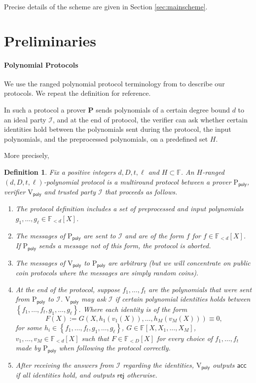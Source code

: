 \documentclass[11pt]{article} %
\newcommand{\F}{\ensuremath{\mathbb F}\xspace}
\newcommand{\rej}{\ensuremath{\mathsf{rej}}\xspace}
\newcommand{\acc}{\ensuremath{\mathsf{acc}}\xspace}
\newcommand{\defeq}{:=}
\newcommand{\prv}{\ensuremath{\mathsf{\mathbf{P}}}\xspace}
\newcommand{\prvpoly}{\ensuremath{\mathrm{P_{\mathsf{poly}}}}\xspace}
\newcommand{\verpoly}{\ensuremath{\mathrm{V_{\mathsf{poly}}}}\xspace}
\newcommand{\ideal}{\ensuremath{\mathcal{I}}\xspace}
\newcommand{\set}[1]{\ensuremath{\left\{#1\right\}}\xspace}
\newcommand{\polysofdeg}[1]{\ensuremath{\F_{< #1}[X]}\xspace}
\newtheorem{dfn}[lemma]{Definition}
\begin{document}
Precise details of the scheme are given in Section \ref{sec:mainscheme}.

\section{Preliminaries}
\paragraph{Polynomial Protocols}
We use the ranged polynomial protocol terminology from \cite{plonk} to describe our protocols. We repeat the definition for reference.

In such a protocol a prover \prv sends polynomials of a certain degree bound $d$ to an ideal party \ideal, and at the end of protocol, the verifier can ask whether certain identities hold between the polynomials sent during the protocol, the input polynomials, and the preprocessed polynomials, on a predefined set $H$.

More precisely,
\begin{dfn}\label{dfn:polyprotocol}
Fix a positive integers $d,D,t,\ell$ and $H\subset \F$.
An $H$-ranged \emph{$(d,D,t,\ell)$-polynomial protocol} is a multiround protocol between a prover \prvpoly, verifier 
\verpoly and trusted party \ideal that proceeds as follows.

\begin{enumerate}
\item The protocol definition includes a set of \emph{preprocessed and input polynomials} $g_1,\ldots,g_\ell \in \polysofdeg{d}$.

\item The messages of \prvpoly are sent to \ideal and are of the form $f$ for $f\in \polysofdeg{d}$. If \prvpoly sends a message not of this form, the protocol is aborted.
 
 
\item The messages of  \verpoly to \prvpoly are arbitrary (but we will concentrate on public coin protocols where the messages are simply random coins).


 \item At the end of the protocol, suppose $f_1,\ldots,f_t$ are the polynomials that were sent from \prvpoly to \ideal. \verpoly may ask \ideal if certain polynomial identities holds between \set{f_1,\ldots,f_t,g_1,\ldots,g_\ell}.
 Where each identity is of the form
 \[F(X)\defeq G(X, h_1(v_1(X)),\ldots,h_M(v_M(X)))\equiv 0,\]
 for some $h_i\in  \set{f_1,\ldots,f_t,g_1,\ldots,g_\ell}$, $G\in \F[X,X_1,\ldots,X_{M}]$, $v_1,\ldots,v_{M} \in \polysofdeg{d}$
 such that $F\in \polysofdeg{D}$ for every choice of $f_1,\ldots,f_t$ made by \prvpoly when following the protocol correctly.
 
 
 
 \item After receiving the answers from \ideal regarding the identities, \verpoly outputs \acc if all identities hold, and outputs \rej otherwise.

\end{enumerate}
 
\end{dfn}
\end{document}
